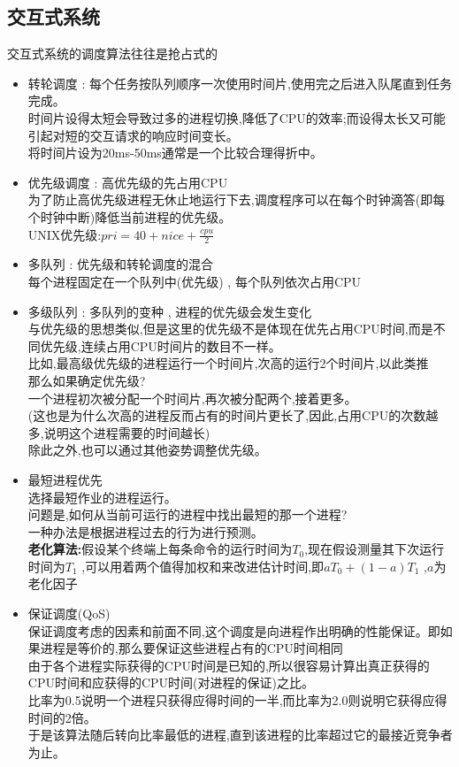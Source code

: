 \documentclass[UTF8,a4paper]{ctexart}
\begin{document}
\subsection{交互式系统}
交互式系统的调度算法往往是抢占式的
\begin{itemize}
	\item 转轮调度 :
	      每个任务按队列顺序一次使用时间片,使用完之后进入队尾直到任务完成。\\
	      时间片设得太短会导致过多的进程切换,降低了CPU的效率;而设得太长又可能引起对短的交互请求的响应时间变长。\\
	      将时间片设为20ms-50ms通常是一个比较合理得折中。

	\item 优先级调度 :
	      高优先级的先占用CPU\\
	      为了防止高优先级进程无休止地运行下去,调度程序可以在每个时钟滴答(即每个时钟中断)降低当前进程的优先级。\\
	      UNIX优先级:$pri = 40 + nice + \frac{cpu}{2}$

	\item 多队列 : 优先级和转轮调度的混合\\
	      每个进程固定在一个队列中(优先级) , 每个队列依次占用CPU

	\item 多级队列 : 多队列的变种 , 进程的优先级会发生变化  \\
	      与优先级的思想类似,但是这里的优先级不是体现在优先占用CPU时间,而是不同优先级,连续占用CPU时间片的数目不一样。\\
	      比如,最高级优先级的进程运行一个时间片,次高的运行2个时间片,以此类推\\
	      那么如果确定优先级?\\
	      一个进程初次被分配一个时间片,再次被分配两个,接着更多。\\
	      (这也是为什么次高的进程反而占有的时间片更长了,因此,占用CPU的次数越多,说明这个进程需要的时间越长)\\
	      除此之外,也可以通过其他姿势调整优先级。

	\item 最短进程优先\\
	      选择最短作业的进程运行。\\
	      问题是,如何从当前可运行的进程中找出最短的那一个进程?\\
	      一种办法是根据进程过去的行为进行预测。\\
	      \textbf{老化算法:}假设某个终端上每条命令的运行时间为$T_0$,现在假设测量其下次运行时间为$T_1$
	      ,可以用着两个值得加权和来改进估计时间,即$aT_0 + (1 - a)T_1$
	      ,$a$为老化因子
	\item 保证调度(QoS)\\
	      保证调度考虑的因素和前面不同,这个调度是向进程作出明确的性能保证。即如果进程是等价的,那么要保证这些进程占有的CPU时间相同\\
	      由于各个进程实际获得的CPU时间是已知的,所以很容易计算出真正获得的CPU时间和应获得的CPU时间(对进程的保证)之比。\\
	      比率为0.5说明一个进程只获得应得时间的一半,而比率为2.0则说明它获得应得时间的2倍。\\
	      于是该算法随后转向比率最低的进程,直到该进程的比率超过它的最接近竞争者为止。


\end{itemize}
\end{document}
